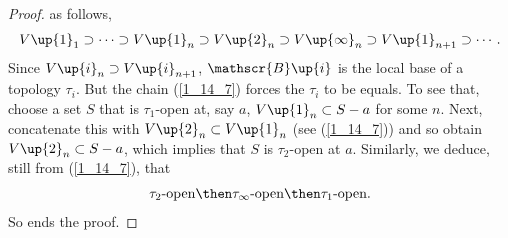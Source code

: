 \begin{proof}
as follows,
%
  \begin{align}\label{1_14_7}
    V\up{1}_1 
      \supset
    \cdots 
      \supset 
    V\up{1}_n
      \supset 
    V\up{2}_n 
      \supset 
    V\up{\infty}_n 
      \supset 
    V\up{1}_{n+1} 
      \supset 
    \cdots .
  \end{align}
%
Since 
  $V\up{i}_n\supset V\up{i}_{n+1}$, 
$\mathscr{B}\up{i}$ is the local base of a topology $\tau_i$. 
But the chain (\ref{1_14_7}) forces the $\tau_i$ to be equals. 
To see that, choose a set $S$ that is $\tau_1$-open at, say $a$, \ie 
%
  $V\up{1}_n \subset S-a$  
%
for some $n$. Next, concatenate this with $V\up{2}_n \subset V\up{1}_n$ (see (\ref{1_14_7})) and so obtain  
%
  $V\up{2}_n \subset S-a$, 
%
which implies that $S$ is $\tau_2$-open at $a$.
Similarly, we deduce, still from (\ref{1_14_7}), that 
\begin{align}
  \tau_2\text{-open} 
    \then 
  \tau_\infty\text{-open} 
    \then 
  \tau_1\text{-open}.
\end{align}
So ends the proof.
\end{proof}






